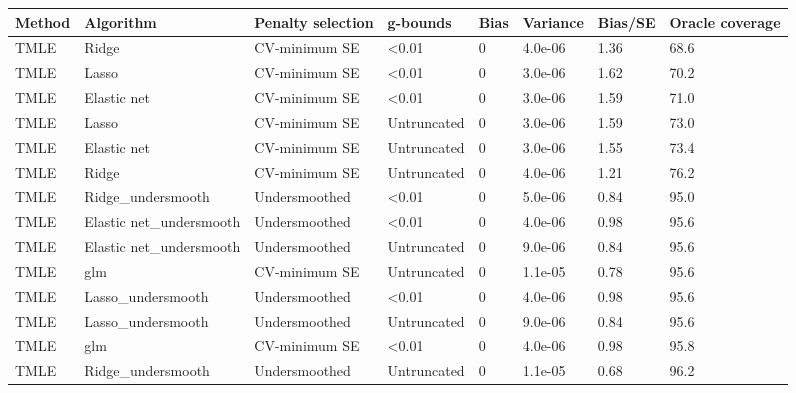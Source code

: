 
\begin{longtable}[l]{llllllll}
\toprule
Method & Algorithm & Penalty selection & g-bounds & Bias & Variance & Bias/SE & Oracle coverage\\
\midrule
TMLE & Ridge & CV-minimum SE & <0.01 & 0 & 4.0e-06 & 1.36 & 68.6\\
TMLE & Lasso & CV-minimum SE & <0.01 & 0 & 3.0e-06 & 1.62 & 70.2\\
TMLE & Elastic net & CV-minimum SE & <0.01 & 0 & 3.0e-06 & 1.59 & 71.0\\
TMLE & Lasso & CV-minimum SE & Untruncated & 0 & 3.0e-06 & 1.59 & 73.0\\
TMLE & Elastic net & CV-minimum SE & Untruncated & 0 & 3.0e-06 & 1.55 & 73.4\\
TMLE & Ridge & CV-minimum SE & Untruncated & 0 & 4.0e-06 & 1.21 & 76.2\\
TMLE & Ridge\_undersmooth & Undersmoothed & <0.01 & 0 & 5.0e-06 & 0.84 & 95.0\\
TMLE & Elastic net\_undersmooth & Undersmoothed & <0.01 & 0 & 4.0e-06 & 0.98 & 95.6\\
TMLE & Elastic net\_undersmooth & Undersmoothed & Untruncated & 0 & 9.0e-06 & 0.84 & 95.6\\
TMLE & glm & CV-minimum SE & Untruncated & 0 & 1.1e-05 & 0.78 & 95.6\\
TMLE & Lasso\_undersmooth & Undersmoothed & <0.01 & 0 & 4.0e-06 & 0.98 & 95.6\\
TMLE & Lasso\_undersmooth & Undersmoothed & Untruncated & 0 & 9.0e-06 & 0.84 & 95.6\\
TMLE & glm & CV-minimum SE & <0.01 & 0 & 4.0e-06 & 0.98 & 95.8\\
TMLE & Ridge\_undersmooth & Undersmoothed & Untruncated & 0 & 1.1e-05 & 0.68 & 96.2\\
\bottomrule
\end{longtable}
